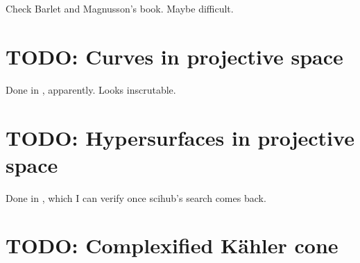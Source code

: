 \documentclass[11pt]{article}
\theoremstyle{definition}
\begin{document}
Check Barlet and Magnusson's book. Maybe difficult.

\section{TODO: Curves in projective space}

Done in \cite{fischer1983differential}, apparently. Looks inscrutable.

\section{TODO: Hypersurfaces in projective space}

Done in \cite{vitter1974curvature}, which I can verify once scihub's search comes back.


\section{TODO: Complexified K\"ahler cone}
\label{complexified-kahler-cone}





\end{document}

